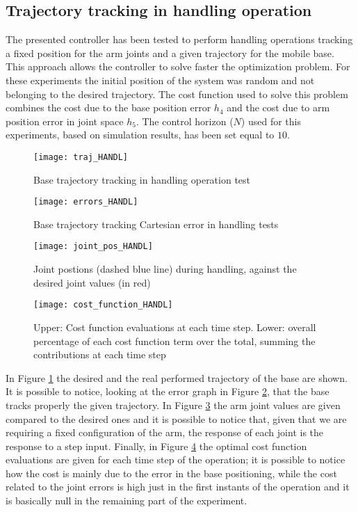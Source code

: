 \subsection{Trajectory tracking in handling operation}
The presented controller has been tested to perform handling operations tracking a fixed position for the arm joints and a given trajectory for the mobile base. This approach allows the controller to solve faster the optimization problem. For these experiments the initial position of the system was random and not belonging to the desired trajectory. The cost function used to solve this problem combines the cost due to the base position error $h_4$ and the cost due to arm position error in joint space $h_5$. The control horizon ($N$) used for this experiments, based on simulation results, has been set equal to $10$. 
\begin{figure}[h!]
\centering
\texttt{[image: traj\_HANDL]}
\caption{Base trajectory tracking in handling operation test}
\label{traj_handl}
\end{figure}
\begin{figure}[h!]
\centering
\texttt{[image: errors\_HANDL]}
\caption{Base trajectory tracking Cartesian error in handling tests}
\label{err_handl}
\end{figure}

\begin{figure}[h!]
\centering
\texttt{[image: joint\_pos\_HANDL]}
\caption{Joint postions (dashed blue line) during handling, against the desired joint values (in red)}
\label{joint_pos_handl}
\end{figure}  

\begin{figure}[h!]
\centering
\texttt{[image: cost\_function\_HANDL]}
\caption{Upper: Cost function evaluations at each time step. Lower: overall percentage of each cost function term over the total, summing the contributions at each time step}
\label{cost_function_HANDL}
\end{figure}

In Figure \ref{traj_handl} the desired and the real performed trajectory of the base are shown. It is possible to notice, looking at the error graph in Figure \ref{err_handl}, that the base tracks properly the given trajectory. In Figure \ref{joint_pos_handl} the arm joint values are given compared to the desired ones and it is possible to notice that, given that we are requiring a fixed configuration of the arm, the response of each joint is the response to a step input. Finally, in Figure \ref{cost_function_HANDL} the optimal cost function evaluations are given for each time step of the operation; it is possible to notice how the cost is mainly due to the error in the base positioning, while the cost related to the joint errors is high just in the first instants of the operation and it is basically null in the remaining part of the experiment. 

